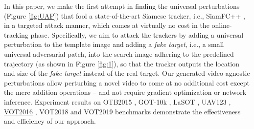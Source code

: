 \documentclass[journal]{IEEEtran}
\newcommand{\ie}{i.e.}
\begin{document}
In this paper, we make the first attempt in finding the universal perturbations (Figure \ref{fig:UAP}) that fool a state-of-the-art Siamese tracker, \ie, SiamFC++ \cite{SiamFC++}, in a targeted attack manner, which comes at virtually no cost in the online-tracking phase. Specifically, we aim to attack the trackers by adding a universal perturbation to the template image and adding a \textit{fake target}, \ie, a small universal adversarial patch, into the search image adhering to the predefined trajectory (as shown in Figure \ref{fig:1}), so that the tracker outputs the location and size of the \textit{fake target} instead of the real target. Our generated video-agnostic perturbations allow perturbing a novel video to come at no additional cost except the mere addition operations -- and not require gradient optimization or network inference. Experiment results on OTB2015 \cite{OTB}, GOT-10k \cite{GOT-10k}, LaSOT \uline{\cite{LaSOT}}, UAV123 \cite{UAV123}, \uline{VOT2016} \cite{VOT2016}, VOT2018 \cite{VOT2018} and VOT2019 \cite{VOT2019} benchmarks demonstrate the effectiveness and efficiency of our approach.

\end{document}
